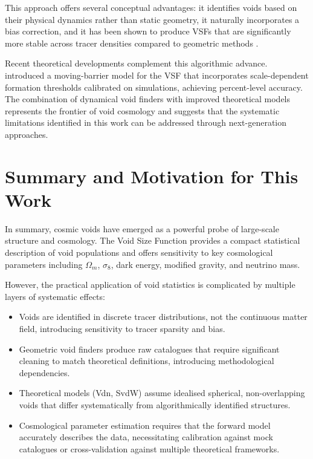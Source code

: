 \documentclass[12pt]{report}
\begin{document}
This approach offers several conceptual advantages: it identifies voids based on their physical dynamics rather than static geometry, it naturally incorporates a bias correction, and it has been shown to produce VSFs that are significantly more stable across tracer densities compared to geometric methods \citep{Sartori2025}.

Recent theoretical developments complement this algorithmic advance. \citet{Verza2024} introduced a moving-barrier model for the VSF that incorporates scale-dependent formation thresholds calibrated on simulations, achieving percent-level accuracy. The combination of dynamical void finders with improved theoretical models represents the frontier of void cosmology and suggests that the systematic limitations identified in this work can be addressed through next-generation approaches.


\section{Summary and Motivation for This Work}

In summary, cosmic voids have emerged as a powerful probe of large-scale structure and cosmology. The Void Size Function provides a compact statistical description of void populations and offers sensitivity to key cosmological parameters including $\Omega_m$, $\sigma_8$, dark energy, modified gravity, and neutrino mass.

However, the practical application of void statistics is complicated by multiple layers of systematic effects:
\begin{itemize}
    \item Voids are identified in discrete tracer distributions, not the continuous matter field, introducing sensitivity to tracer sparsity and bias.
    \item Geometric void finders produce raw catalogues that require significant cleaning to match theoretical definitions, introducing methodological dependencies.
    \item Theoretical models (Vdn, SvdW) assume idealised spherical, non-overlapping voids that differ systematically from algorithmically identified structures.
    \item Cosmological parameter estimation requires that the forward model accurately describes the data, necessitating calibration against mock catalogues or cross-validation against multiple theoretical frameworks.
\end{itemize}
\end{document}
